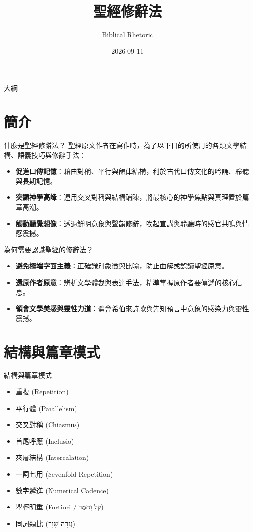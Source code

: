 \documentclass{beamer}
\title{聖經修辭法}
\subtitle{Biblical Rhetoric}
\date{2026-09-11}
\begin{document}
\begin{frame}
  \titlepage
\end{frame}

\begin{frame}{大綱}
  \tableofcontents
\end{frame}

\section{簡介}

\begin{frame}{什麼是聖經修辭法？}
  聖經原文作者在寫作時，為了以下目的所使用的各類文學結構、語義技巧與修辭手法：\\
  \begin{itemize}
    \item \textbf{促進口傳記憶}：藉由對稱、平行與韻律結構，利於古代口傳文化的吟誦、聆聽與長期記憶。
    \item \textbf{突顯神學高峰}：運用交叉對稱與結構鋪陳，將最核心的神學焦點與真理置於篇章高潮。
    \item \textbf{觸動聽覺想像}：透過鮮明意象與聲韻修辭，喚起宣講與聆聽時的感官共鳴與情感震撼。
  \end{itemize}
\end{frame}

\begin{frame}{為何需要認識聖經的修辭法？}
  \begin{itemize}
    \item \textbf{避免極端字面主義}：正確識別象徵與比喻，防止曲解或誤讀聖經原意。
    \item \textbf{還原作者原意}：辨析文學體裁與表達手法，精準掌握原作者要傳遞的核心信息。
    \item \textbf{領會文學美感與靈性力道}：體會希伯來詩歌與先知預言中意象的感染力與靈性震撼。
  \end{itemize}
\end{frame}

\section{結構與篇章模式}

\begin{frame}{結構與篇章模式}
  \begin{itemize}
    \item 重複 (Repetition)
    \item 平行體 (Parallelism)
    \item 交叉對稱 (Chiasmus)
    \item 首尾呼應 (Inclusio)
    \item 夾層結構 (Intercalation)
    \item 一詞七用 (Sevenfold Repetition)
    \item 數字遞進 (Numerical Cadence)
    \item 舉輕明重 (Fortiori / \texthebrew{קַל וָחֹמֶר})
    \item 同詞類比 (\texthebrew{גְּזֵרָה שָׁוָה})
  \end{itemize}
\end{frame}
\end{document}
